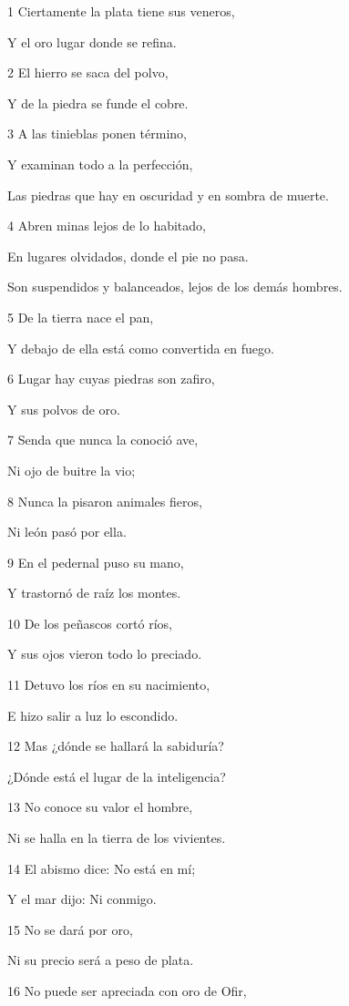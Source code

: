\par 1 Ciertamente la plata tiene sus veneros,
\par Y el oro lugar donde se refina.
\par 2 El hierro se saca del polvo,
\par Y de la piedra se funde el cobre.
\par 3 A las tinieblas ponen término,
\par Y examinan todo a la perfección,
\par Las piedras que hay en oscuridad y en sombra de muerte. 
\par 4 Abren minas lejos de lo habitado,
\par En lugares olvidados, donde el pie no pasa.
\par Son suspendidos y balanceados, lejos de los demás hombres.
\par 5 De la tierra nace el pan,
\par Y debajo de ella está como convertida en fuego.
\par 6 Lugar hay cuyas piedras son zafiro,
\par Y sus polvos de oro.
\par 7 Senda que nunca la conoció ave,
\par Ni ojo de buitre la vio;
\par 8 Nunca la pisaron animales fieros,
\par Ni león pasó por ella.
\par 9 En el pedernal puso su mano,
\par Y trastornó de raíz los montes.
\par 10 De los peñascos cortó ríos,
\par Y sus ojos vieron todo lo preciado.
\par 11 Detuvo los ríos en su nacimiento,
\par E hizo salir a luz lo escondido.
\par 12 Mas ¿dónde se hallará la sabiduría?
\par ¿Dónde está el lugar de la inteligencia?
\par 13 No conoce su valor el hombre,
\par Ni se halla en la tierra de los vivientes.
\par 14 El abismo dice: No está en mí;
\par Y el mar dijo: Ni conmigo.
\par 15 No se dará por oro,
\par Ni su precio será a peso de plata.
\par 16 No puede ser apreciada con oro de Ofir,
